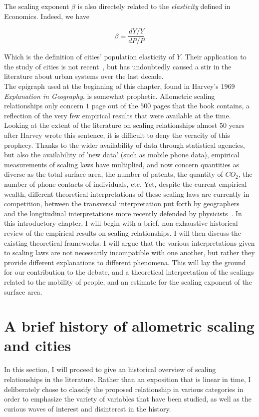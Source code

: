The scaling exponent $\beta$ is also directely related to the \emph{elasticity}
defined in Economics. Indeed, we have

\begin{equation}
    \beta = \frac{dY/Y}{dP/P}
\end{equation}

Which is the definition of cities' population elasticity of $Y$. Their application to the study of cities
is not recent~\cite{Stewart:1947}, but has undoubtedly caused a stir in the
literature about urban systems over the last decade.\\

The epigraph used at the beginning of this chapter, found in Harvey's 1969
\emph{Explanation in Geography}, is somewhat prophetic.  Allometric scaling
relationships only concern $1$ page out of the $500$ pages that the book
contains, a reflection of the very few empirical results that were available at
the time.  Looking at the extent of the literature on scaling relationships
almost $50$ years after Harvey wrote this sentence, it is difficult to deny the
veracity of this prophecy. Thanks to the wider availability of data through
statistical agencies, but also the availability of 'new data' (such as mobile
phone data), empirical measurements of scaling laws have multiplied,
and now concern quantities as diverse as the total surface area, the number of
patents, the quantity of $CO_2$, the number of phone contacts of individuals, etc. Yet, despite the current empirical wealth, different theoretical interpretations of these scaling laws are currently in competition, between the transversal interpretation put forth by geographers~\cite{Pumain:2006} and the longitudinal interpretations more recently defended by physicists~\cite{Bettencourt:2013, Louf:2014_smog}.  In this introductory chapter, I will begin with a brief, non exhaustive historical review of the empirical results on scaling relationships. I will then discuss the existing theoretical frameworks. I will argue that the various interpretations given to scaling laws are not necessarily incompatible with one another, but rather they provide different explanations to different phenomena.  This will lay the ground for our contribution to the debate, and a theoretical interpretation of the scalings related to the mobility of people, and an estimate for the scaling exponent of the surface area.  \section{A brief history of allometric scaling and cities} \label{sec:a_brief_history_of_allometric_scaling_and_cities} In this section, I will proceed to give an historical overview of scaling relationships in the literature. Rather than an exposition that is linear in time, I deliberately chose to classify the proposed relationship in various categories in order to emphasize the variety of variables that have been studied, as well as the curious waves of interest and disinterest in the history.  
